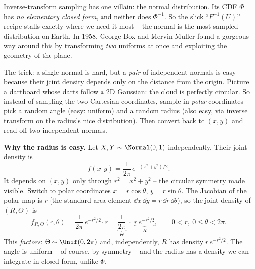 Inverse-transform sampling has one villain: the normal distribution. Its CDF $\Phi$ has
\emph{no elementary closed form}, and neither does $\Phi^{-1}$. So the slick
``$F^{-1}(U)$'' recipe stalls exactly where we need it most -- the normal is the most
sampled distribution on Earth. In 1958, George Box and Mervin Muller found a gorgeous way
around this by transforming \emph{two} uniforms at once and exploiting the geometry of the
plane.

\begin{intuitionbox}
The trick: a single normal is hard, but a \emph{pair} of independent normals is easy --
because their joint density depends only on the distance from the origin. Picture a
dartboard whose darts follow a 2D Gaussian: the cloud is perfectly circular. So instead of
sampling the two Cartesian coordinates, sample in \emph{polar} coordinates -- pick a random
angle (easy: uniform) and a random radius (also easy, via inverse transform on the radius's
nice distribution). Then convert back to $(x,y)$ and read off two independent normals.
\end{intuitionbox}

\begin{whybox}
\textbf{Why the radius is easy.} Let $X,Y \sim \Normal(0,1)$ independently. Their joint
density is
\[
  f(x,y) = \frac{1}{2\pi}\,e^{-(x^2+y^2)/2}.
\]
It depends on $(x,y)$ only through $r^2 = x^2+y^2$ -- the circular symmetry made visible.
Switch to polar coordinates $x = r\cos\theta$, $y=r\sin\theta$. The Jacobian of the polar
map is $r$ (the standard area element $\dd x\,\dd y = r\,\dd r\,\dd\theta$), so the joint
density of $(R,\Theta)$ is
\[
  f_{R,\Theta}(r,\theta) = \frac{1}{2\pi}\,e^{-r^2/2}\cdot r
  = \underbrace{\frac{1}{2\pi}}_{\Theta}\;\cdot\;\underbrace{r\,e^{-r^2/2}}_{R},
  \qquad 0<r,\ 0\le\theta<2\pi.
\]
This \emph{factors}: $\Theta \sim \Unif(0,2\pi)$ and, independently, $R$ has density
$r\,e^{-r^2/2}$. The angle is uniform -- of course, by symmetry -- and the radius has a
density we can integrate in closed form, unlike $\Phi$.
\end{whybox}

